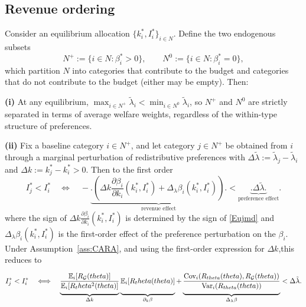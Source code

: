 \documentclass[master.tex]{subfiles}
\begin{document}
\subsection{Revenue ordering}

\begin{proposition}\label{prop:revenueordering}
Consider an equilibrium allocation $\{k_i^\ast,I_i^\ast\}_{i\in N}$. Define the two endogenous subsets 
\[
N^+:=\{i\in N:\beta_i^\ast>0\},
\qquad
N^0:=\{i\in N:\beta_i^\ast=0\},
\]
which partition \(N\) into categories that contribute to the budget and categories that do not contribute to the budget (either may be empty). Then:

\noindent\textbf{(i)} At any equilibrium, $\max_{i \in N^+} \tilde\lambda_i < \min_{i \in N^0} \tilde\lambda_i$, so \(N^+\) and \(N^0\) are strictly separated in terms of average welfare weights, regardless of the within-type structure of preferences.

\noindent\textbf{(ii)} Fix a baseline category $i \in N^+$, and let category $j \in N^+$ be obtained from $i$ through a marginal perturbation of redistributive preferences with $\Delta\tilde\lambda:=\tilde\lambda_j-\tilde\lambda_i$ and $\Delta k:=k_j^\ast-k_i^\ast>0$. Then to the first order
\[
I_j^\ast<I_i^\ast \quad\Longleftrightarrow\quad -\underbrace{\Bigg.\left(\Delta k\frac{\partial \beta_i}{\partial k_i}(k_i^\ast,I_i^\ast)+\Delta_{\lambda}\beta_i(k_i^\ast,I_i^\ast)\right)\Bigg.}_{\text{revenue effect}}<\underbrace{\Bigg.\Delta\tilde\lambda\Bigg.}_{\text{preference effect}}.
\]
where the sign of $\Delta k \frac{\partial \beta_i}{\partial k_i}(k_i^\ast,I_i^\ast)$ is determined by the sign of \eqref{Eujmd} and $\Delta_{\lambda}\beta_i(k_i^\ast,I_i^\ast)$ is the  first-order effect of the preference perturbation on the $\beta_i$. Under Assumption~\ref{ass:CARA},  and using the first-order expression for $\Delta k$,this reduces to
\[
I_j^\ast<I_i^\ast \quad\Longleftrightarrow\quad \underbrace{\Bigg.\frac{\mathbb{E}_i[R_{\mathcal G}(theta)]}{\mathbb{E}_i[R_theta^2(theta)]}\Bigg.}_{\Delta k} \underbrace{\Bigg.\mathbb{E}_i[R_theta(theta)]\Bigg. }_{\partial_k\beta}+ 
\underbrace{\Bigg.\frac{
\mathrm{Cov}_i\!\left(
R_{theta}(theta),R_{\mathcal G}(theta)
\right)
}{
\mathrm{Var}_i\!\left(
R_{theta}(theta)
\right)
}\Bigg.}_{\Delta_\lambda \beta} < \Delta\tilde\lambda.
\]
\end{proposition}
\end{document}
